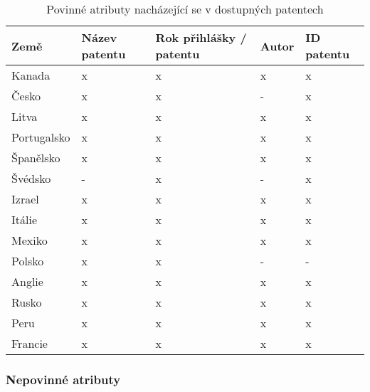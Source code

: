 	\begin{table}[h!]
	\centering
	\begin{tabular}{|>{\centering\arraybackslash}p{2.2cm}|>{\centering\arraybackslash}p{2cm}|>{\centering\arraybackslash}p{3cm}|>{\centering\arraybackslash}p{2cm}|>{\centering\arraybackslash}p{2.5cm}|} 
	\hline
	\textbf{Země}    & \textbf{Název patentu} & \textbf{Rok přihlášky / patentu} & \textbf{Autor} & \textbf{ID patentu}                \\ 
	\hline
	Kanada & x & x & x & x \\
	\hline
	Česko & x & x & - & x \\
	\hline
	Litva & x & x & x & x \\
	\hline
	Portugalsko & x & x & x & x \\
	\hline
	Španělsko & x & x & x & x \\
	\hline
	Švédsko & - & x & - & x \\
	\hline
	Izrael & x & x & x & x \\
	\hline
	Itálie & x & x & x & x \\
	\hline
	Mexiko & x & x & x & x \\
	\hline
	Polsko & x & x & - & - \\
	\hline
	Anglie & x & x & x & x \\
	\hline
	Rusko & x & x & x & x \\
	\hline
	Peru & x & x & x & x \\
	\hline
	Francie & x & x & x & x \\
	\hline
	\end{tabular}
	\caption{Povinné atributy nacházející se v dostupných patentech}
	\label{tab:table_attributes_critical}
	\end{table}

\subsubsection{Nepovinné atributy}

